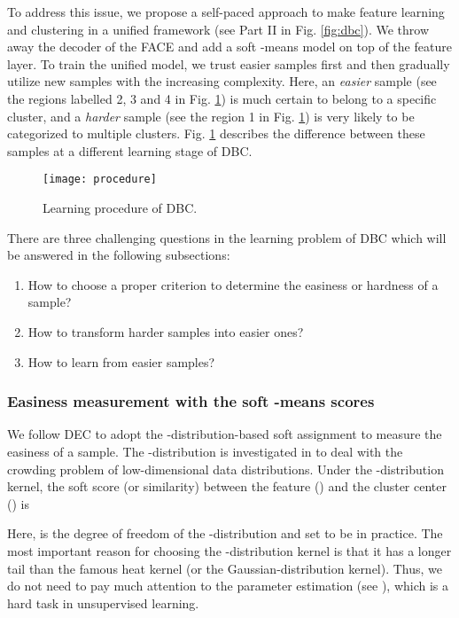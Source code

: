 \documentclass[preprint,12pt]{elsarticle}
\begin{document}
To address this issue, we propose a self-paced approach to make feature learning and clustering in a unified
framework (see Part II in Fig. \ref{fig:dbc}). We throw away the decoder of the FACE and add a soft -means
model on top of the feature layer. To train the unified model, we trust easier samples first and then gradually
utilize new samples with the increasing complexity. Here, an \textit{easier} sample (see the regions labelled 2, 3
and 4 in Fig. \ref{fig:procedure}) is much certain to belong to a specific cluster, and a \textit{harder} sample
(see the region 1 in Fig. \ref{fig:procedure}) is very likely to be categorized to multiple clusters.
Fig. \ref{fig:procedure} describes the difference between these samples at a different learning stage of DBC.

\begin{figure}[!htb]
\centering
\texttt{[image: procedure]}
\caption{Learning procedure of DBC.}
\label{fig:procedure}
\end{figure}


There are three challenging questions in the learning problem of DBC which will be answered in the following subsections:
\begin{enumerate}
\item How to choose a proper criterion to determine the easiness or hardness of a sample?
\item How to transform harder samples into easier ones?
\item How to learn from easier samples?
\end{enumerate}


\subsubsection{Easiness measurement with the soft -means scores}

We follow DEC \cite{Xie2015DEC} to adopt the -distribution-based soft assignment to measure the easiness of a sample.
The -distribution is investigated in \cite{Maaten2008tSNE} to deal with the crowding problem of low-dimensional data distributions. Under the -distribution kernel, the soft score (or similarity) between the
feature  () and the cluster center  () is

Here,  is the degree of freedom of the -distribution and set to be  in practice. The most important
reason for choosing the -distribution kernel is that it has a longer tail than the famous heat kernel
(or the Gaussian-distribution kernel). Thus, we do not need to pay much attention to the parameter estimation (see \cite{Maaten2008tSNE}), which is a hard task in unsupervised learning.
\end{document}
